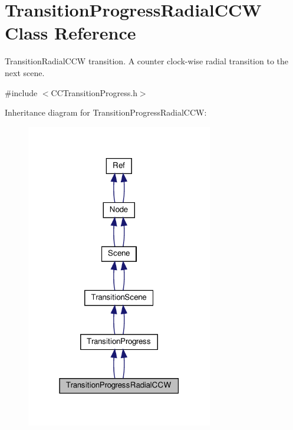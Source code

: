 \hypertarget{classTransitionProgressRadialCCW}{}\section{Transition\+Progress\+Radial\+C\+CW Class Reference}
\label{classTransitionProgressRadialCCW}


Transition\+Radial\+C\+CW transition. A counter clock-\/wise radial transition to the next scene.  




{\ttfamily \#include $<$C\+C\+Transition\+Progress.\+h$>$}



Inheritance diagram for Transition\+Progress\+Radial\+C\+CW\+:
\nopagebreak
\begin{figure}[H]
\begin{center}
\leavevmode
\includegraphics[width=231pt]{classTransitionProgressRadialCCW__inherit__graph}
\end{center}
\end{figure}


